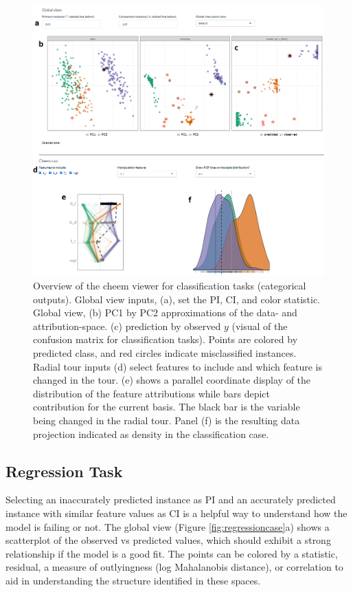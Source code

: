 \documentclass[11pt,twoside]{article}
\begin{document}
\begin{figure}

{\centering \includegraphics[width=1\linewidth]{./figures/app_classification} 

}

\caption{Overview of the cheem viewer for classification tasks (categorical outputs). Global view inputs, (a), set the PI, CI, and color statistic. Global view, (b) PC1 by PC2 approximations of the data- and attribution-space. (c) prediction by observed $y$ (visual of the confusion matrix for classification tasks). Points are colored by predicted class, and red circles indicate misclassified instances. Radial tour inputs (d) select features to include and which feature is changed in the tour. (e) shows a parallel coordinate display of the distribution of the feature attributions while bars depict contribution for the current basis. The black bar is the variable being changed in the radial tour. Panel (f) is the resulting data projection indicated as density in the classification case.}\label{fig:classificationcase}
\end{figure}

\hypertarget{regression-task}{%
\subsection{Regression Task}\label{regression-task}}

Selecting an inaccurately predicted instance as PI and an accurately predicted instance with similar feature values as CI is a helpful way to understand how the model is failing or not. The global view (Figure \ref{fig:regressioncase}a) shows a scatterplot of the observed vs predicted values, which should exhibit a strong relationship if the model is a good fit. The points can be colored by a statistic, residual, a measure of outlyingness (log Mahalanobis distance), or correlation to aid in understanding the structure identified in these spaces.
\end{document}
